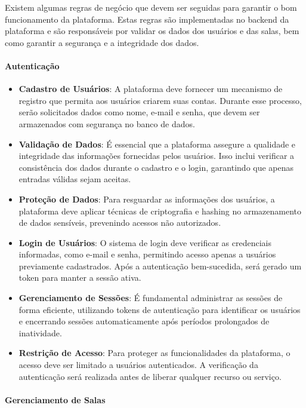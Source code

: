 Existem algumas regras de negócio que devem ser seguidas para garantir o bom funcionamento da plataforma. Estas regras são implementadas no backend da plataforma e são responsáveis por validar os dados dos usuários e das salas, bem como garantir a segurança e a integridade dos dados.

\paragraph{Autenticação}

\begin{itemize}
    \item \textbf{Cadastro de Usuários}: A plataforma deve fornecer um mecanismo de registro que permita aos usuários criarem suas contas. Durante esse processo, serão solicitados dados como nome, e-mail e senha, que devem ser armazenados com segurança no banco de dados.
    \item \textbf{Validação de Dados}: É essencial que a plataforma assegure a qualidade e integridade das informações fornecidas pelos usuários. Isso inclui verificar a consistência dos dados durante o cadastro e o login, garantindo que apenas entradas válidas sejam aceitas.
    \item \textbf{Proteção de Dados}: Para resguardar as informações dos usuários, a plataforma deve aplicar técnicas de criptografia e hashing no armazenamento de dados sensíveis, prevenindo acessos não autorizados.
    \item \textbf{Login de Usuários}: O sistema de login deve verificar as credenciais informadas, como e-mail e senha, permitindo acesso apenas a usuários previamente cadastrados. Após a autenticação bem-sucedida, será gerado um token para manter a sessão ativa.
    \item \textbf{Gerenciamento de Sessões}: É fundamental administrar as sessões de forma eficiente, utilizando tokens de autenticação para identificar os usuários e encerrando sessões automaticamente após períodos prolongados de inatividade.
    \item \textbf{Restrição de Acesso}: Para proteger as funcionalidades da plataforma, o acesso deve ser limitado a usuários autenticados. A verificação da autenticação será realizada antes de liberar qualquer recurso ou serviço.
\end{itemize}

\paragraph{Gerenciamento de Salas}

